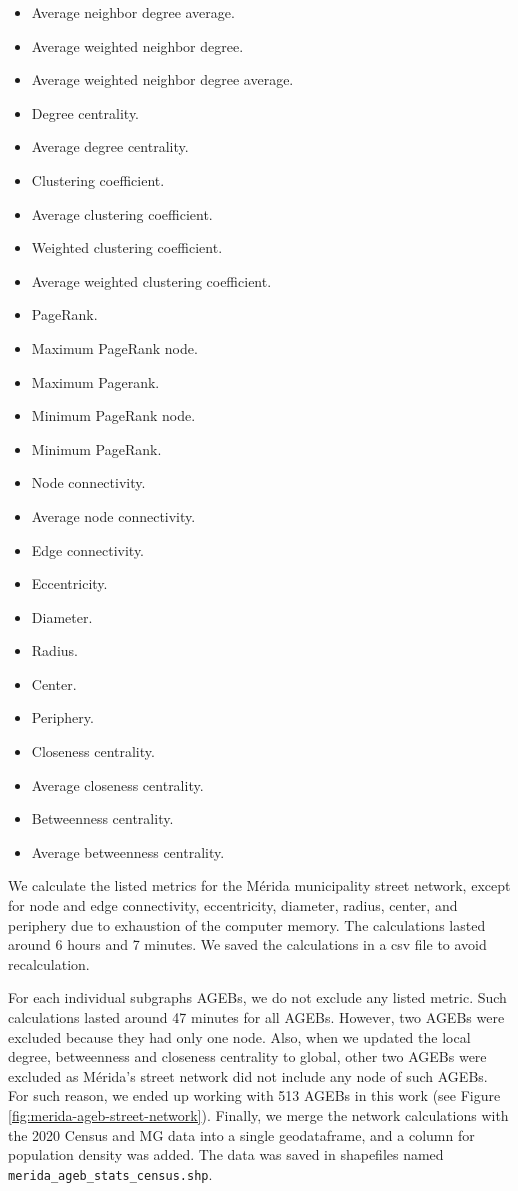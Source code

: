 \begin{itemize}
\item Average neighbor degree average.
\item Average weighted neighbor degree.
\item Average weighted neighbor degree average.
\item Degree centrality.
\item Average degree centrality.
\item Clustering coefficient.
\item Average clustering coefficient.
\item Weighted clustering coefficient.
\item Average weighted clustering coefficient.
\item PageRank.
\item Maximum PageRank node.
\item Maximum Pagerank.
\item Minimum PageRank node.
\item Minimum PageRank.
\item Node connectivity.
\item Average node connectivity.
\item Edge connectivity.
\item Eccentricity.
\item Diameter.
\item Radius.
\item Center.
\item Periphery.
\item Closeness centrality.
\item Average closeness centrality.
\item Betweenness centrality.
\item Average betweenness centrality.
\end{itemize}

We calculate the listed metrics for the Mérida municipality street network, except for node and edge connectivity, eccentricity, diameter, radius, center, and periphery due to exhaustion of the computer memory. The calculations lasted around 6 hours and 7 minutes. We saved the calculations in a csv file to avoid recalculation.

For each individual subgraphs AGEBs, we do not exclude any listed metric. Such calculations lasted around 47 minutes for all AGEBs. However, two AGEBs were excluded because they had only one node. Also, when we updated the local degree, betweenness and closeness centrality to global, other two AGEBs were excluded as Mérida's street network did not include any node of such AGEBs. For such reason, we ended up working with 513 AGEBs in this work (see Figure \ref{fig:merida-ageb-street-network}). Finally, we merge the network calculations with the 2020 Census and MG data into a single geodataframe, and a column for population density was added. The data was saved in shapefiles named \verb|merida_ageb_stats_census.shp|.

